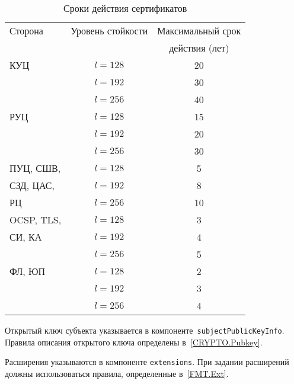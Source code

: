 \begin{table}
\caption{Сроки действия сертификатов}
\label{Table.CERT.Validity}
\begin{tabular}{|l|c|c|}
\hline
Сторона & Уровень стойкости & Максимальный срок\\
        &                   & действия (лет)\\
\hline
\hline

КУЦ & $l=128$ & 20\\
\cline{2-3} & $l=192$ & 30\\
\cline{2-3} & $l=256$ & 40\\
\hline

РУЦ & $l=128$ & 15\\
\cline{2-3} & $l=192$ & 20\\
\cline{2-3} & $l=256$ & 30\\
\hline

ПУЦ, СШВ,    & $l=128$ & 5\\
\cline{2-3}
СЗД, ЦАС,    & $l=192$ & 8\\
\cline{2-3} 
РЦ           & $l=256$ & 10\\
\hline

OCSP, TLS,  & $l=128$ & 3 \\
\cline{2-3}
СИ, КА & $l=192$ & 4\\
\cline{2-3} & $l=256$ & 5\\
\hline

ФЛ, ЮП & $l=128$ & 2 \\
\cline{2-3} & $l=192$ & 3 \\
\cline{2-3} & $l=256$ & 4 \\
\hline
\end{tabular}
\end{table}

Открытый ключ субъекта указывается в
компоненте~\texttt{subjectPublicKeyInfo}. Правила описания открытого ключа
определены в~\ref{CRYPTO.Pubkey}.

Расширения указываются в компоненте \texttt{еxtensions}. При задании 
расширений должны использоваться правила, определенные в~\ref{FMT.Ext}. 
